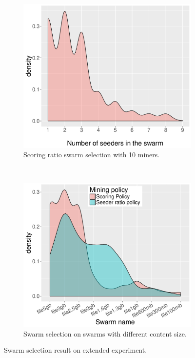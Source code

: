 \begin{figure}[tb]
	\begin{adjustwidth}{-1.5cm}{}
		\begin{subfigure}[t]{0.6\textwidth}
			\centering
			\includegraphics[width=\textwidth]{pics/results/sc10_density.pdf}
			\caption{Scoring ratio swarm selection with 10 miners.}
			\label{fig:scattersc10}
		\end{subfigure}
		~
		\begin{subfigure}[t]{0.6\textwidth}
			\centering
			\includegraphics[width=\textwidth]{pics/results/scmulti_density.pdf}
			\caption{Swarm selection on swarms with different content size.}
			\label{fig:scatterscmulti}
		\end{subfigure}
		\caption{Swarm selection result on extended experiment.}
	\end{adjustwidth}
\end{figure}

